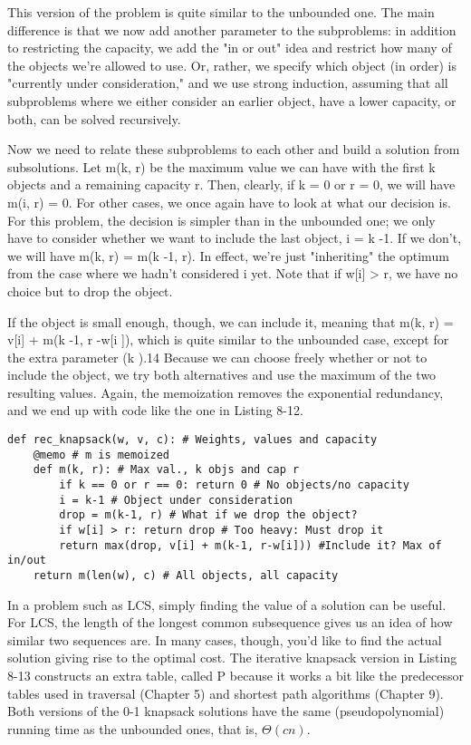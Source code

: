 This version of the problem is quite similar to the unbounded one. The main difference is that we
now add another parameter to the subproblems: in addition to restricting the capacity, we add the "in or out" idea and restrict how many of the objects we're allowed to use. Or, rather, we specify which object (in order) is "currently under consideration," and we use strong induction, assuming that all subproblems where we either consider an earlier object, have a lower capacity, or both, can be solved recursively.

Now we need to relate these subproblems to each other and build a solution from subsolutions. Let
m(k, r) be the maximum value we can have with the first k objects and a remaining capacity r. Then, clearly, if k = 0 or r = 0, we will have m(i, r) = 0. For other cases, we once again have to look at what our decision is. For this problem, the decision is simpler than in the unbounded one; we only have to consider whether we want to include the last object, i = k -1. If we don't, we will have m(k, r) = m(k -1, r). In effect, we're just "inheriting" the optimum from the case where we hadn't considered i yet. Note that if w[i] > r, we have no choice but to drop the object.

If the object is small enough, though, we can include it, meaning that m(k, r) = v[i] + m(k -1, r -w[i ]), which is quite similar to the unbounded case, except for the extra parameter (k ).14 Because we can choose freely whether or not to include the object, we try both alternatives and use the maximum of the two resulting values. Again, the memoization removes the exponential redundancy, and we end up with code like the one in Listing 8-12.

\begin{lstlisting}[caption={A Memoized Recursive Solution to the 0-1 Knapsack Problem}]
def rec_knapsack(w, v, c): # Weights, values and capacity
    @memo # m is memoized
    def m(k, r): # Max val., k objs and cap r
        if k == 0 or r == 0: return 0 # No objects/no capacity
        i = k-1 # Object under consideration
        drop = m(k-1, r) # What if we drop the object?
        if w[i] > r: return drop # Too heavy: Must drop it
        return max(drop, v[i] + m(k-1, r-w[i])) #Include it? Max of in/out
    return m(len(w), c) # All objects, all capacity
\end{lstlisting}

In a problem such as LCS, simply finding the value of a solution can be useful. For LCS, the length of the longest common subsequence gives us an idea of how similar two sequences are. In many cases, though, you'd like to find the actual solution giving rise to the optimal cost. The iterative knapsack version in Listing 8-13 constructs an extra table, called P because it works a bit like the predecessor tables used in traversal (Chapter 5) and shortest path algorithms (Chapter 9). Both versions of the 0-1 knapsack solutions have the same (pseudopolynomial) running time as the unbounded ones, that is, $\Theta(cn)$.

